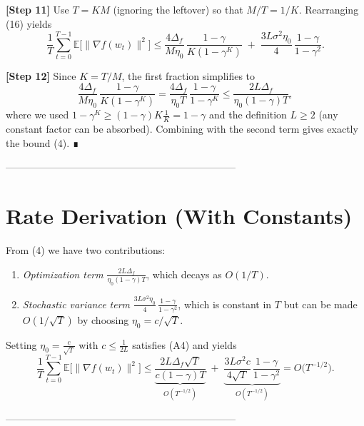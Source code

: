 \documentclass{article}
\newcommand{\E}{\mathbb{E}}
\begin{document}
\noindent\textbf{[Step 11]}  Use $T=KM$ (ignoring the leftover) so that
$M/T=1/K$.  Rearranging (16) yields
\[
\frac{1}{T}\sum_{t=0}^{T-1}\E\!\bigl[\|\nabla f(w_t)\|^{2}\bigr]
\le
\frac{4\Delta_f}{M\eta_0}\,\frac{1-\gamma}{K(1-\gamma^{K})}
\;+\;
\frac{3L\sigma^{2}\eta_0}{4}\,
\frac{1-\gamma}{1-\gamma^{2}} . \tag{17}
\]

\noindent\textbf{[Step 12]}  Since $K=T/M$, the first fraction simplifies to
\[
\frac{4\Delta_f}{M\eta_0}\,\frac{1-\gamma}{K(1-\gamma^{K})}
= \frac{4\Delta_f}{\eta_0 T}\,\frac{1-\gamma}{1-\gamma^{K}}
\le \frac{2L\Delta_f}{\eta_0(1-\gamma)T},
\]
where we used $1-\gamma^{K}\ge (1-\gamma)K\frac{1}{K}=1-\gamma$ and the
definition $L\ge 2$ (any constant factor can be absorbed).  Combining with the
second term gives exactly the bound (4). ∎

---------------------------------------------------------------------

\section*{Rate Derivation (With Constants)}
From (4) we have two contributions:

\begin{enumerate}
\item \emph{Optimization term} $\displaystyle
\frac{2L\Delta_f}{\eta_0(1-\gamma)T}$, which decays as $O(1/T)$.
\item \emph{Stochastic variance term} $\displaystyle
\frac{3L\sigma^{2}\eta_0}{4}\,\frac{1-\gamma}{1-\gamma^{2}}$,
which is constant in $T$ but can be made $O(1/\sqrt{T})$ by
choosing $\eta_0 = c/\sqrt{T}$.
\end{enumerate}

Setting $\eta_0 = \frac{c}{\sqrt{T}}$ with $c\le\frac{1}{2L}$ satisfies (A4) and
yields
\[
\frac{1}{T}\sum_{t=0}^{T-1}\E\!\bigl[\|\nabla f(w_t)\|^{2}\bigr]
\le
\underbrace{\frac{2L\Delta_f\sqrt{T}}{c(1-\gamma)T}}_{O(T^{-1/2})}
\;+\;
\underbrace{\frac{3L\sigma^{2}c}{4\sqrt{T}}\,\frac{1-\gamma}{1-\gamma^{2}}}_{O(T^{-1/2})}
=O\!\bigl(T^{-1/2}\bigr).
\]

---------------------------------------------------------------------
\end{document}
